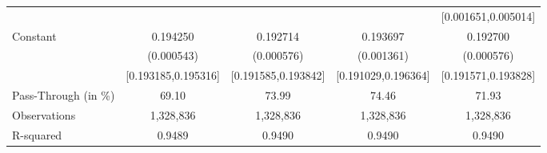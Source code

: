 {\begin{tabular}{l*{4}{c}}
                    &                     &                     &                     &[0.001651,0.005014]         \\
Constant            &    0.194250\sym{***}&    0.192714\sym{***}&    0.193697\sym{***}&    0.192700\sym{***}\\
                    &  (0.000543)         &  (0.000576)         &  (0.001361)         &  (0.000576)         \\
                    &[0.193185,0.195316]         &[0.191585,0.193842]         &[0.191029,0.196364]         &[0.191571,0.193828]         \\
\midrule
Pass-Through (in \%)&       69.10         &       73.99         &       74.46         &       71.93         \\
Observations        &   1,328,836         &   1,328,836         &   1,328,836         &   1,328,836         \\
R-squared           &      0.9489         &      0.9490         &      0.9490         &      0.9490         \\
\bottomrule
\end{tabular}
}
